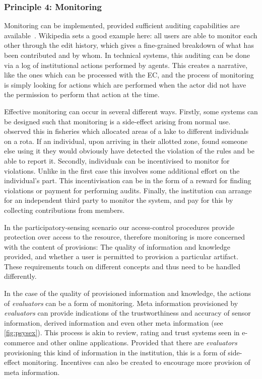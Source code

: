 \subsubsection*{Principle 4: Monitoring}

Monitoring can be implemented, provided sufficient auditing capabilities are available~\citep{Pitt2012b}. Wikipedia sets a good example here: all users are able to monitor each other through the edit history, which gives a fine-grained breakdown of what has been contributed and by whom. 
In technical systems, this auditing can be done via a log of institutional actions performed by agents. This creates a narrative, like the ones which can be processed with the \ac{EC}, and the process of monitoring is simply looking for actions which are performed when the actor did not have the permission to perform that action at the time.

Effective monitoring can occur in several different ways. 
Firstly, some systems can be designed such that monitoring is a side-effect arising from normal use. 
 observed this in fisheries which allocated areas of a lake to different individuals on a rota. 
If an individual, upon arriving in their allotted zone, found someone else using it they would obviously have detected the violation of the rules and be able to report it. 
Secondly, individuals can be incentivised to monitor for violations. Unlike in the first case this involves some additional effort on the individual's part. 
This incentivisation can be in the form of a reward for finding violations or payment for performing audits. 
Finally, the institution can arrange for an independent third party to monitor the system, and pay for this by collecting contributions from members.

In the participatory-sensing scenario our access-control procedures provide protection over access to the resource, therefore monitoring is more concerned with the content of provisions: The quality of information and knowledge provided, and whether a user is permitted to provision a particular artifact. 
These requirements touch on different concepts and thus need to be handled differently. 

In the case of the quality of provisioned information and knowledge, the actions of \emph{evaluators} can be a form of monitoring. 
Meta information provisioned by \emph{evaluators} can provide indications of the trustworthiness and accuracy of sensor information, derived information and even other meta information (see \autoref{fig:psysex}). 
This process is akin to review, rating and trust systems seen in e-commerce and other online applications. Provided that there are \emph{evaluators} provisioning this kind of information in the institution, this is a form of side-effect monitoring. 
Incentives can also be created to encourage more provision of meta information.

